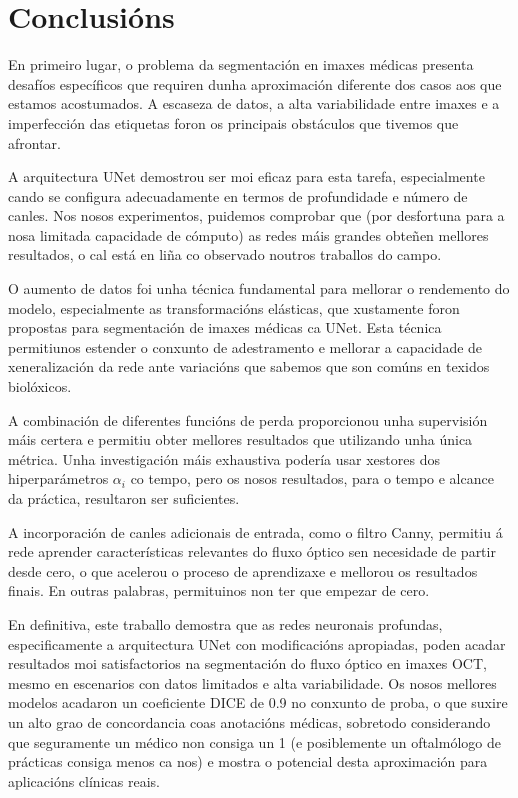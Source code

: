 \documentclass{article}
\begin{document}
\section{Conclusións}


En primeiro lugar, o problema da segmentación en imaxes médicas presenta desafíos específicos que requiren dunha aproximación diferente dos casos aos que estamos acostumados. A escaseza de datos, a alta variabilidade entre imaxes e a imperfección das etiquetas foron os principais obstáculos que tivemos que afrontar.

A arquitectura UNet demostrou ser moi eficaz para esta tarefa, especialmente cando se configura adecuadamente en termos de profundidade e número de canles. Nos nosos experimentos, puidemos comprobar que (por desfortuna para a nosa limitada capacidade de cómputo) as redes máis grandes obteñen mellores resultados, o cal está en liña co observado noutros traballos  do campo.

O aumento de datos foi unha técnica fundamental para mellorar o rendemento do modelo, especialmente as transformacións elásticas, que xustamente foron propostas para segmentación de imaxes médicas ca UNet. Esta técnica permitiunos estender o conxunto de adestramento e mellorar a capacidade de xeneralización da rede ante variacións que sabemos que son comúns en texidos biolóxicos.

A combinación de diferentes funcións de perda proporcionou unha supervisión máis certera e permitiu obter mellores resultados que utilizando unha única métrica. Unha investigación máis exhaustiva podería usar xestores dos hiperparámetros $\alpha_i$ co tempo, pero os nosos resultados, para o tempo e alcance da práctica, resultaron ser suficientes.

A incorporación de canles adicionais de entrada, como o filtro Canny, permitiu á rede aprender características relevantes do fluxo óptico sen necesidade de partir desde cero, o que acelerou o proceso de aprendizaxe e mellorou os resultados finais. En outras palabras, permituinos non ter que empezar de cero.

En definitiva, este traballo demostra que as redes neuronais profundas, especificamente a arquitectura UNet con modificacións apropiadas, poden acadar resultados moi satisfactorios na segmentación do fluxo óptico en imaxes OCT, mesmo en escenarios con datos limitados e alta variabilidade. Os nosos mellores modelos acadaron un coeficiente DICE de 0.9 no conxunto de proba, o que suxire un alto grao de concordancia coas anotacións médicas, sobretodo considerando que seguramente un médico non consiga un 1 (e posiblemente un oftalmólogo de prácticas consiga menos ca nos) e mostra o potencial desta aproximación para aplicacións clínicas reais.



\newpage

\end{document}

